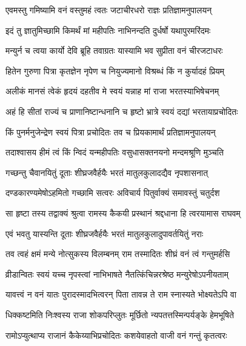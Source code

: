 \twolineshloka
{एवमस्तु गमिष्यामि वनं वस्तुमहं त्वतः}
{जटाचीरधरो राज्ञः प्रतिज्ञामनुपालयन्} %

\twolineshloka
{इदं तु ज्ञातुमिच्छामि किमर्थं मां महीपतिः}
{नाभिनन्दति दुर्धर्षो यथापुरमरिंदमः} %

\twolineshloka
{मन्युर्न च त्वया कार्यो देवि ब्रूहि तवाग्रतः}
{यास्यामि भव सुप्रीता वनं चीरजटाधरः} %

\twolineshloka
{हितेन गुरुणा पित्रा कृतज्ञेन नृपेण च}
{नियुज्यमानो विश्रब्धं किं न कुर्यादहं प्रियम्} %

\twolineshloka
{अलीकं मानसं त्वेकं हृदयं दहतीव मे}
{स्वयं यन्नाह मां राजा भरतस्याभिषेचनम्} %

\twolineshloka
{अहं हि सीतां राज्यं च प्राणानिष्टान्धनानि च}
{हृष्टो भ्रात्रे स्वयं दद्यां भरतायाप्रचोदितः} %

\twolineshloka
{किं पुनर्मनुजेन्द्रेण स्वयं पित्रा प्रचोदितः}
{तव च प्रियकामार्थं प्रतिज्ञामनुपालयन्} %

\twolineshloka
{तदाश्वासय हीमं त्वं किं न्विदं यन्महीपतिः}
{वसुधासक्तनयनो मन्दमश्रूणि मुञ्चति} %

\twolineshloka
{गच्छन्तु चैवानयितुं दूताः शीघ्रजवैर्हयैः}
{भरतं मातुलकुलादद्यैव नृपशासनात्} %

\twolineshloka
{दण्डकारण्यमेषोऽहमितो गच्छामि सत्वरः}
{अविचार्य पितुर्वाक्यं समावस्तुं चतुर्दश} %

\twolineshloka
{सा हृष्टा तस्य तद्वाक्यं श्रुत्वा रामस्य कैकयी}
{प्रस्थानं श्रद्दधाना हि त्वरयामास राघवम्} %

\twolineshloka
{एवं भवतु यास्यन्ति दूताः शीघ्रजवैर्हयैः}
{भरतं मातुलकुलादुपावर्तयितुं नराः} %

\twolineshloka
{तव त्वहं क्षमं मन्ये नोत्सुकस्य विलम्बनम्}
{राम तस्मादितः शीघ्रं वनं त्वं गन्तुमर्हसि} %

\twolineshloka
{व्रीडान्वितः स्वयं यच्च नृपस्त्वां नाभिभाषते}
{नैतत्किंचिन्नरश्रेष्ठ मन्युरेषोऽपनीयताम्} %

\twolineshloka
{यावत्त्वं न वनं यातः पुरादस्मादभित्वरन्}
{पिता तावन्न ते राम स्नास्यते भोक्ष्यतेऽपि वा} %

\twolineshloka
{धिक्कष्टमिति निःश्वस्य राजा शोकपरिप्लुतः}
{मूर्छितो न्यपतत्तस्मिन्पर्यङ्के हेमभूषिते} %

\twolineshloka
{रामोऽप्युत्थाप्य राजानं कैकेय्याभिप्रचोदितः}
{कशयेवाहतो वाजी वनं गन्तुं कृतत्वरः} %

